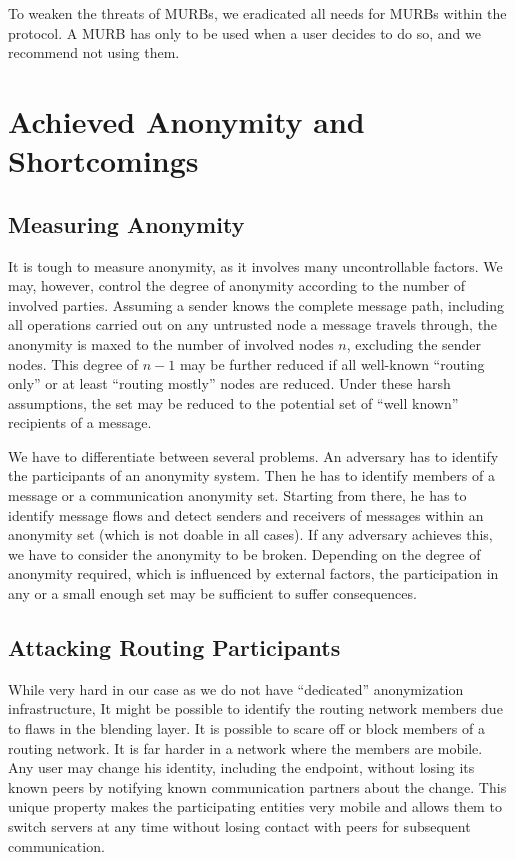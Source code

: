 To weaken the threats of MURBs, we eradicated all needs for MURBs within the protocol. A MURB has only to be used when a user decides to do so, and we recommend not using them.

\section{Achieved Anonymity and Shortcomings}
\subsection{Measuring Anonymity}
It is tough to measure anonymity, as it involves many uncontrollable factors. We may, however, control the degree of anonymity according to the number of involved parties. Assuming a sender knows the complete message path, including all operations carried out on any untrusted node a message travels through, the anonymity is maxed to the number of involved nodes $n$, excluding the sender nodes. This degree of $n-1$ may be further reduced if all well-known ``routing only'' or at least ``routing mostly'' nodes are reduced. Under these harsh assumptions, the set may be reduced to the potential set of ``well known'' recipients of a message.

We have to differentiate between several problems. An adversary has to identify the participants of an anonymity system. Then he has to identify members of a message or a communication anonymity set. Starting from there, he has to identify message flows and detect senders and receivers of messages within an anonymity set (which is not doable in all cases). If any adversary achieves this, we have to consider the anonymity to be broken. Depending on the degree of anonymity required, which is influenced by external factors, the participation in any or a small enough set may be sufficient to suffer consequences.

\subsection{Attacking Routing Participants}
While very hard in our case as we do not have ``dedicated'' anonymization infrastructure, It might be possible to identify the routing network members due to flaws in the blending layer. It is possible to scare off or block members of a routing network. It is far harder in a network where the members are mobile. Any user may change his identity, including the endpoint, without losing its known peers by notifying known communication partners about the change. This unique property makes the participating entities very mobile and allows them to switch servers at any time without losing contact with peers for subsequent communication.

